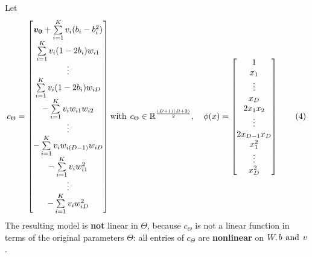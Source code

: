 \documentclass[a4paper, 12pt]{article}
\begin{document}
Let 
\[
c_\Theta =
\begin{bmatrix}
    \boldsymbol{v_0}  + \sum\limits_{i=1}^{K} v_i (b_i - b_i^2) \\
    \sum\limits_{i=1}^{K} v_i (1 - 2b_i) w_{i1} \\
    \vdots \\
    \sum\limits_{i=1}^{K} v_i (1 - 2b_i) w_{iD} \\
    -\sum\limits_{i=1}^{K} v_i w_{i1}w_{i2} \\
    \vdots \\
    -\sum\limits_{i=1}^{K}v_iw_{i(D-1)}w_{iD} \\
   -\sum\limits_{i=1}^{K}v_i w_{i1}^{2} \\
    \vdots \\
    -\sum\limits_{i=1}^{K}v_i w_{iD}^{2}
\end{bmatrix} \text{with} \hspace{0.15 cm} {c}_{\Theta} \in \mathbb{R}^{\frac{(D+1)(D+2)}{2}}
,
\quad 
\phi(x) =
\begin{bmatrix}
    1 \\
    x_1 \\
    \vdots \\
    x_D \\
    2x_1x_2 \\
    \vdots \\
    2x_{D-1}x_D \\
    x_{1}^2 \\
    \vdots \\
     x_{D}^2
\end{bmatrix}
\tag{4}
\] 
The resulting model is \textbf{not} linear in $\Theta$, because $c_\Theta$ is not a linear function in terms of the original parameters $\Theta$: all entries of $c_\Theta$ are \textbf{nonlinear} on $W, b \hspace{0.15cm}\text{and} \hspace{0.15cm} v$.
\end{document}
